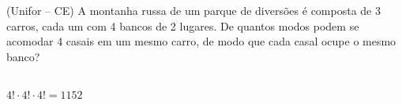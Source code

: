 \begin{ex}
(Unifor – CE) A montanha russa de um parque de diversões é composta de 3 carros, cada um com 4 bancos de 2 lugares. De quantos modos podem se acomodar 4 casais em um mesmo carro, de modo que cada casal ocupe o mesmo banco?
  \begin{sol}
    \phantom{A}\\
    $4!\cdot4!\cdot4!=1152$
  \end{sol}
\end{ex}